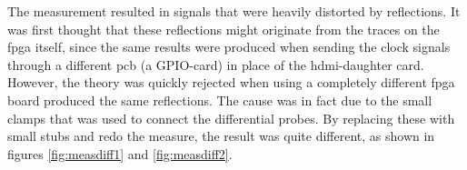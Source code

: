 \documentclass[main.tex]{subfiles}
\begin{document}
The measurement resulted in signals that were heavily distorted by reflections. It was first thought that these reflections might originate from the traces on the \gls{fpga} itself, since the same results were produced when sending the clock signals through a different \gls{pcb} (a GPIO-card) in place of the \gls{hdmi}-daughter card. However, the theory was quickly rejected when using a completely different \gls{fpga} board produced the same reflections. The cause was in fact due to the small clamps that was used to connect the differential probes. By replacing these with small stubs and redo the measure, the result was quite different, as shown in figures \ref{fig:measdiff1} and \ref{fig:measdiff2}.

\begin{figure}[H]
   \begin{floatrow}
   \end{floatrow}
\end{figure}
\end{document}
